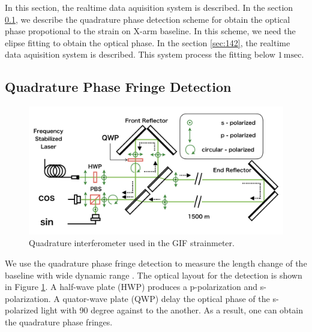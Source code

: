In this section, the realtime data aquisition system is described.
In the section \cref{sec:141}, we describe the quadrature phase detection scheme for obtain the optical phase propotional to the strain on X-arm baseline. In this scheme, we need the elipse fitting to obtain the optical phase. In the section \cref{sec:142}, the realtime data aquisition system is described. This system process the fitting below $1\,\mathrm{msec}$.

\subsection{Quadrature Phase Fringe Detection} \label{sec:141}
\begin{figure}[h]
  \begin{center}
    \includegraphics[width=13.0cm]{./img_chap4/img413.png}
    \caption{Quadrature interferometer used in the GIF strainmeter.}\label{img:img413}
  \end{center}
\end{figure}
We use the quadrature phase fringe detection to measure the length change of the baseline with wide dynamic range \cite{bobroff1993recent}. The optical layout for the detection is shown in Figure  \ref{img:img413}. A half-wave plate (HWP) produces a p-polarization and s-polarization. A quator-wave plate (QWP) delay the optical phase of the s-polarized light with 90 degree against to the another. As a result, one can obtain the quadrature phase fringes.

